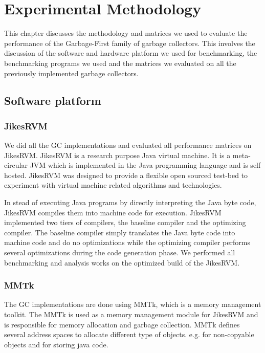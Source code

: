 \chapter{Experimental Methodology}
\label{cha:methodology}

This chapter discusses the methodology and matrices we used to evaluate the performance
of the Garbage-First family of garbage collectors. This involves the discussion of
the software and hardware platform we used for benchmarking,
the benchmarking programs we used and the 
matrices we evaluated on all the previously implemented garbage collectors.

\section{Software platform}
\label{sec:softplat}

\subsection{JikesRVM}

We did all the GC implementations and evaluated all performance matrices on JikesRVM.
JikesRVM is a research purpose Java virtual machine. It is a meta-circular JVM
which is implemented in the Java programming language and is self hosted.
JikesRVM was designed to provide a flexible open sourced test-bed to
experiment with virtual machine related algorithms and technologies.

In stead of executing Java programs by directly interpreting the Java byte code,
JikesRVM compiles them into machine code for execution.
JikesRVM implemented two tiers of compilers, the baseline compiler and the optimizing compiler.
The baseline compiler simply translates the Java byte code into machine code and do no
optimizations while the optimizing compiler performs several optimizations during the
code generation phase. We performed all benchmarking and analysis works on the
optimized build of the JikesRVM.

\subsection{MMTk}

The GC implementations are done using MMTk, which is a memory management toolkit.
The MMTk is used as a memory management module for JikesRVM and is responsible for
memory allocation and garbage collection. MMTk defines several address spaces to
allocate different type of objects. e.g.  for non-copyable objects
and  for storing java code.

